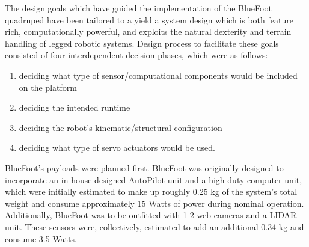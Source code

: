 	The design goals which have guided the implementation of the BlueFoot quadruped have been tailored to a yield a system design which is both feature rich, computationally powerful, and exploits the natural dexterity and terrain handling of legged robotic systems. 
	Design process to facilitate these goals consisted of four interdependent decision phases, which were as follows:
		\begin{enumerate}
			\item{deciding what type of sensor/computational components would be included on the platform} 
			\item{deciding the intended runtime}
			\item{deciding the robot's kinematic/structural configuration}
			\item{deciding what type of servo actuators would be used.} 
		\end{enumerate}

	BlueFoot's payloads were planned first. BlueFoot was originally designed to incorporate an in-house designed AutoPilot unit and a high-duty computer unit, which were initially estimated to make up roughly 0.25 kg of the system's total weight and consume approximately 15 Watts of power during nominal operation. Additionally, BlueFoot was to be outfitted with 1-2 web cameras and a LIDAR unit. These sensors were, collectively, estimated to add an additional 0.34 kg and consume 3.5 Watts.



